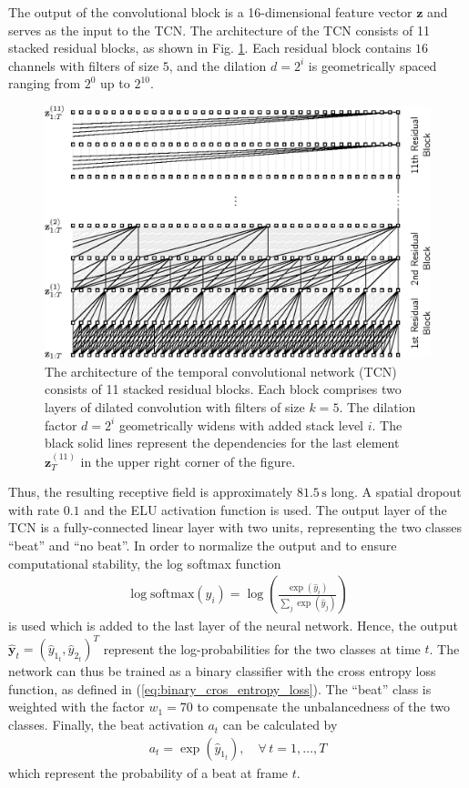 \documentclass{scrartcl}
\begin{document}
The output of the convolutional block is a 16-dimensional feature vector $\mathbf z$ and serves as the input to the TCN. The architecture of the TCN consists of 11 stacked residual blocks, as shown in Fig. \ref{fig:tcn}. Each residual block contains $16$ channels with filters of size $5$, and the dilation $d=2^i$ is geometrically spaced ranging from $2^0$ up to $2^{10}$. 
\begin{figure}[htbp]
\centering
\includegraphics[scale=1.0]{figures/tcn.eps}
\caption{The architecture of the temporal convolutional network (TCN) consists of 11 stacked residual blocks. Each block comprises two layers of dilated convolution with filters of size $k=5$. The dilation factor $d=2^i$ geometrically widens with added stack level $i$. The black solid lines represent the dependencies for the last element $\mathbf z_T^{(11)}$ in the upper right corner of the figure.}
\label{fig:tcn}
\end{figure}    
Thus, the resulting receptive field is approximately $81.5\,\text{s}$ long. A spatial dropout with rate $0.1$ and the ELU activation function is used. The output layer of the TCN is a fully-connected linear layer with two units, representing the two classes ``beat'' and ``no beat''. In order to normalize the output and to ensure computational stability, the log softmax function 
\begin{align}
\log \text{softmax}(\hat{y}_i) = \log\left(\frac{\exp{(\hat{y}_i)}}{\sum_j \exp(\hat{y}_j)}\right)
\end{align} 
is used which is added to the last layer of the neural network. Hence, the output $\hat{\mathbf y}_t = (\hat{y}_{1_t}, \hat{y}_{2_t})^T$ represent the log-probabilities for the two classes at time $t$. The network can thus be trained as a binary classifier with the cross entropy loss function, as defined in (\ref{eq:binary_cros_entropy_loss}). The ``beat'' class is weighted with the factor $w_1=70$ to compensate the unbalancedness of the two classes. Finally, the beat activation $a_t$ can be calculated by
\begin{align}
a_t = \exp \left({\hat{y}_{1_t}} \right), \quad \forall \, t= 1,\dots,T
\end{align}  
which represent the probability of a beat at frame $t$.
\end{document}
